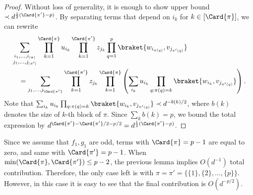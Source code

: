 \begin{proof}
    Without loss of generality, it is enough to show upper bound \(\prec d^{\frac{1}{2}(\Card{\pi'} - p)}\). 
    By separating terms that depend on \(i_k\) for \(k \in [\Card{\pi}]\), we can rewrite
    \begin{equation}
        \begin{aligned}
        &\sum_{\substack{i_1, \ldots, i_{\lvert \pi \rvert} \\
    j_1, \ldots, j_{\rvert \pi' \rvert}}}  \prod_{k = 1}^{\Card{\pi}}  u_{i_k} \prod_{k = 1}^{\Card{\pi'}}  z_{j_k} \prod_{q=1}^p \braket{w_{i_{\pi(q)}}, v_{j_{\pi'(q)}}} \\
    &\quad = \sum_{j_1, \ldots, j_{\Card{\pi'}}} \prod_{k=1}^{\Card{\pi'}} z_{j_k} \prod_{k=1}^{\Card{\pi}} \left(\sum_{i_k} u_{i_k} \prod_{q: \pi(q) = k} \braket{w_{i_k}, v_{j_{\pi'(q)}}}\right).
        \end{aligned}
\end{equation}
    Note that \(\sum_{i_k} u_{i_k} \prod_{q: \pi(q) = k} \braket{w_{i_k}, v_{j_{\pi'(q)}}} \prec d^{-b(k)/2}\), where \(b(k)\) denotes the size of \(k\)-th block of \(\pi\). Since \(\sum_{k} b(k) = p\), we bound the total expression by \(d^{\Card{\pi'} - \Card{\pi'}/2 - p/2} = d^{\frac{1}{2}(\Card{\pi'} - p)}\).
\end{proof}
Since we assume that \(f_1, g_1\) are odd, terms with \(\Card{\pi} = p - 1\) are equal to zero, and same with \(\Card{\pi'} = p - 1\). When \(\min(\Card{\pi}, \Card{\pi'}) \leq p - 2\), the previous lemma implies \(O(d^{-1})\) total contribution. Therefore, the only case left is with \(\pi = \pi' = \{\{1\}, \{2\}, \ldots, \{p\}\}\). However, in this case it is easy to see that the final contribution is \(O(d^{-p/2})\).

